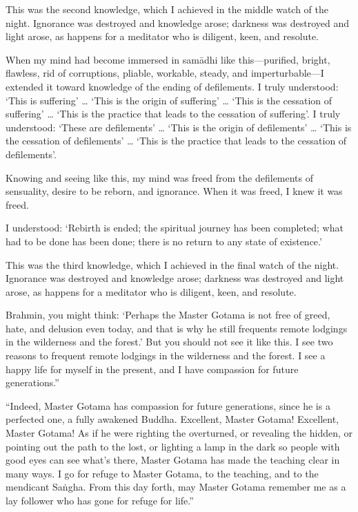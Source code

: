 \documentclass[12pt,openany]{book}%
\begin{document}
This was the second knowledge, which I achieved in the middle watch of the night. Ignorance was destroyed and knowledge arose; darkness was destroyed and light arose, as happens for a meditator who is diligent, keen, and resolute. 

When my mind had become immersed in \textsanskrit{samādhi} like this—purified, bright, flawless, rid of corruptions, pliable, workable, steady, and imperturbable—I extended it toward knowledge of the ending of defilements. I truly understood: ‘This is suffering’ … ‘This is the origin of suffering’ … ‘This is the cessation of suffering’ … ‘This is the practice that leads to the cessation of suffering’. I truly understood: ‘These are defilements’ … ‘This is the origin of defilements’ … ‘This is the cessation of defilements’ … ‘This is the practice that leads to the cessation of defilements’. 

Knowing and seeing like this, my mind was freed from the defilements of sensuality, desire to be reborn, and ignorance. When it was freed, I knew it was freed. 

I understood: ‘Rebirth is ended; the spiritual journey has been completed; what had to be done has been done; there is no return to any state of existence.’ 

This was the third knowledge, which I achieved in the final watch of the night. Ignorance was destroyed and knowledge arose; darkness was destroyed and light arose, as happens for a meditator who is diligent, keen, and resolute. 

Brahmin, you might think: ‘Perhaps the Master Gotama is not free of greed, hate, and delusion even today, and that is why he still frequents remote lodgings in the wilderness and the forest.’ But you should not see it like this. I see two reasons to frequent remote lodgings in the wilderness and the forest. I see a happy life for myself in the present, and I have compassion for future generations.” 

“Indeed, Master Gotama has compassion for future generations, since he is a perfected one, a fully awakened Buddha. Excellent, Master Gotama! Excellent, Master Gotama! As if he were righting the overturned, or revealing the hidden, or pointing out the path to the lost, or lighting a lamp in the dark so people with good eyes can see what’s there, Master Gotama has made the teaching clear in many ways. I go for refuge to Master Gotama, to the teaching, and to the mendicant \textsanskrit{Saṅgha}. From this day forth, may Master Gotama remember me as a lay follower who has gone for refuge for life.” 
\end{document}
